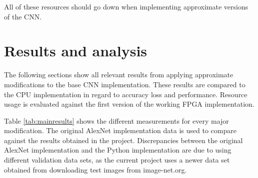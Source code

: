 \begin{enumerate}
All of these resources should go down when implementing approximate versions of the CNN.

\section{Results and analysis}

The following sections show all relevant results from applying approximate modifications
to the base CNN implementation. These results are compared to the CPU implementation
in regard to accuracy loss and performance. Resource usage is evaluated against
the first version of the working FPGA implementation.

Table \ref{tab:mainresults} shows the different measurements for every major modification. 
The original AlexNet implementation data is used to compare against the results obtained 
in the project. Discrepancies between the original AlexNet implementation and the
Python implementation are due to using different validation data sets, as the current
project uses a newer data set obtained from downloading test images from image-net.org.

\begin{table}[H]
    \begin{center}
        \caption{Execution time, error rate and resource usage for different types of kernel and approximate modifications.}
            \label{tab:mainresults}
    \end{center}
\end{table}


\end{enumerate}
